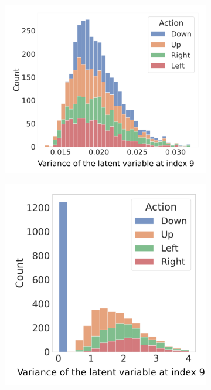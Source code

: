 \documentclass[twoside,11pt]{article}
\begin{document}
\begin{figure}[ht!]
    \centering
    \begin{subfigure}{.4\textwidth}
        \centering
        \includegraphics[draft=false,width=\linewidth]{cka_figures/chmm_109_Transition_variance}
        \caption{}\label{sfig:cka-trans-chmm-sa}
    \end{subfigure}%
    \begin{subfigure}{.4\textwidth}
        \centering
        \includegraphics[draft=false,width=\linewidth]{cka_figures/chmm_113_Transition_variance}
        \caption{}\label{sfig:cka-trans-chmm2-sa}
    \end{subfigure}


\end{figure}
\end{document}
